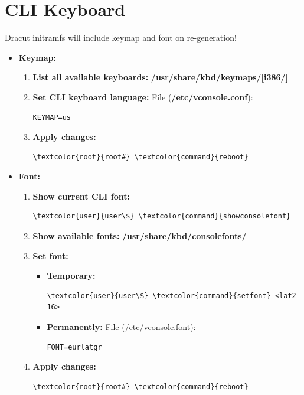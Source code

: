 \documentclass[10pt, a4paper, onecolumn, oneside, titlepage, openany]{book}
\begin{document}
\section{CLI Keyboard}
Dracut initramfs will include keymap and font on re-generation!
\begin{itemize}
    \item \textbf{Keymap:}
    \begin{enumerate}
        \item \textbf{List all available keyboards:}
\newline \textbf{\textcolor{dir}{/usr/share/kbd/keymaps/[i386/]}}
        \item \textbf{Set CLI keyboard language:}
\newline File (\textbf{\textcolor{file}{/etc/vconsole.conf}}):
\begin{Verbatim}[commandchars=\\\{\}]
KEYMAP=us
\end{Verbatim}
    \item \textbf{Apply changes:}
\begin{Verbatim}[commandchars=\\\{\}]
\textcolor{root}{root#} \textcolor{command}{reboot}
\end{Verbatim}
    \end{enumerate}
    \item \textbf{Font:}
    \begin{enumerate}
        \item \textbf{Show current CLI font:}
\begin{Verbatim}[commandchars=\\\{\}]
\textcolor{user}{user\$} \textcolor{command}{showconsolefont}
\end{Verbatim}
        \item \textbf{Show available fonts:}
\newline \textbf{\textcolor{dir}{/usr/share/kbd/consolefonts/}}
        \item \textbf{Set font:}
        \begin{itemize}
            \item \textbf{Temporary:}
\begin{Verbatim}[commandchars=\\\{\}]
\textcolor{user}{user\$} \textcolor{command}{setfont} <lat2-16>
\end{Verbatim}
            \item \textbf{Permanently:}
\newline File (\textcolor{file}{/etc/vconsole.font}):
\begin{Verbatim}[commandchars=\\\{\}]
FONT=eurlatgr
\end{Verbatim}
        \end{itemize}
        \item \textbf{Apply changes:}
\begin{Verbatim}[commandchars=\\\{\}]
\textcolor{root}{root#} \textcolor{command}{reboot}
\end{Verbatim}
    \end{enumerate}
\end{itemize}
\end{document}
